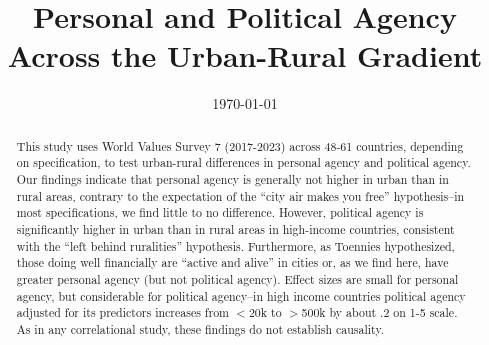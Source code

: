 \documentclass[10pt, letterpaper]{article}
\date{{}\today \hspace{.2in}\xxivtime}
\title{  
  Personal and Political Agency Across the Urban-Rural Gradient  
}
\author{
}
\begin{document}

\maketitle
\vspace{-.4in}
\begin{center}

\end{center}


\begin{abstract}
  \noindent This study uses World Values Survey 7 (2017-2023) across 48-61
  countries, depending on specification, to test urban-rural differences in personal agency and political agency. Our findings indicate that personal agency is generally not higher in
  urban than in rural areas, contrary to the expectation of the ``city air makes you free'' hypothesis--in most specifications, we find little to no difference. However, political agency is significantly higher in urban than in rural areas in high-income countries, consistent with the ``left behind ruralities''
  hypothesis. Furthermore, as Toennies hypothesized, those doing well
  financially are ``active and alive'' in cities or, as we find here, have
  greater personal agency (but not political agency). Effect sizes are
  small for personal agency, but considerable for political agency--in high income countries
  political agency adjusted for its predictors  increases from $<$20k to $>$500k by about .2 on 1-5 scale.
  As in any correlational study, these findings do not establish causality. 
\end{abstract}
\vspace{.15in} 
\vspace{.25in} 

\end{document}
